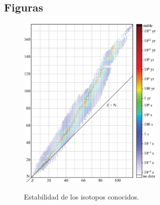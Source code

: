 \documentclass[10pt,twocolumn,titlepage]{article}
\begin{document}
\subsection*{Figuras}
\begin{figure}[htb!]
\centering
\includegraphics[width=7cm]{isotopos.eps}
\label{isotopos}
\caption{Estabilidad de los isotopos conocidos.}
\end{figure}
\end{document}
